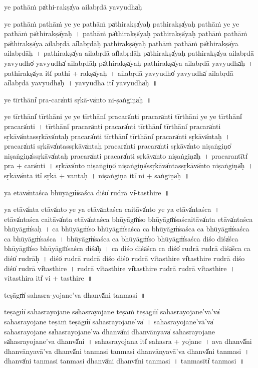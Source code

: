 \documentclass[parskip, DIV=14]{scrartcl}
\begin{document}
{ye pa॒thāṁ pa̍thi॒-rakṣa̍ya ailabṛ॒dā yavyudha̍ḥ

ye pa॒thāṁ pa॒thāṁ ye ye pa॒thāṁ pa̍thi॒rakṣa̍yaḥ pathi॒rakṣa̍yaḥ pa॒thāṁ ye ye pa॒thāṁ pa̍thi॒rakṣa̍yaḥ~।
pa॒thāṁ pa̍thi॒rakṣa̍yaḥ pathi॒rakṣa̍yaḥ pa॒thāṁ pa॒thāṁ pa̍thi॒rakṣa̍ya ailabṛ॒dā ai̍labṛ॒dāḥ pathi॒rakṣa̍yaḥ pa॒thāṁ pa॒thāṁ pa̍thi॒rakṣa̍ya ailabṛ॒dāḥ~।
pa॒thi॒rakṣa̍ya ailabṛ॒dā ai̍labṛ॒dāḥ pa̍thi॒rakṣa̍yaḥ pathi॒rakṣa̍ya ailabṛ॒dā ya॒vyudho̍ ya॒vyudha̍ ailabṛ॒dāḥ pa̍thi॒rakṣa̍yaḥ pathi॒rakṣa̍ya ailabṛ॒dā ya॒vyudha̍ḥ~।
pa॒thi॒rakṣa̍ya॒ iti̍ pathi + rakṣa̍yaḥ~।
ai॒la॒bṛ॒dā ya॒vyudho̍ ya॒vyudha̍ ailabṛ॒dā ai̍labṛ॒dā ya॒vyudha̍ḥ~।
ya॒vyudha॒ iti̍ ya॒vyudha̍ḥ~॥

ye tī॒rthāni̍ pra॒-cara̍nti sṛ॒kā-va̍nto ni-ṣa॒ṅgiṇa̍ḥ~॥

ye tī॒rthāni̍ tī॒rthāni॒ ye ye tī॒rthāni̍ pra॒cara̍nti pra॒cara̍nti tī॒rthāni॒ ye ye tī॒rthāni̍ pra॒cara̍nti~।
tī॒rthāni̍ pra॒cara̍nti pra॒cara̍nti tī॒rthāni̍ tī॒rthāni̍ pra॒cara̍nti sṛ॒kāva̍ntassṛ॒kāva̍ntaḥ pra॒cara̍nti tī॒rthāni̍ tī॒rthāni̍ pra॒cara̍nti sṛ॒kāva̍ntaḥ~।
pra॒cara̍nti sṛ॒kāva̍ntassṛ॒kāva̍ntaḥ pra॒cara̍nti pra॒cara̍nti sṛ॒kāva̍nto niṣa॒ṅgiṇo̍ niṣa॒ṅgiṇa̍ssṛ॒kāva̍ntaḥ pra॒cara̍nti pra॒cara̍nti sṛ॒kāva̍nto niṣa॒ṅgiṇa̍ḥ~।
pra॒cara॒ntīti̍ pra + cara̍nti~।
sṛ॒kāva̍nto niṣa॒ṅgiṇo̍ niṣa॒ṅgiṇa̍ssṛ॒kāva̍ntassṛ॒kāva̍nto niṣa॒ṅgiṇa̍ḥ~।
sṛ॒kāva̍nta॒ iti̍ sṛ॒kā + va॒nta॒ḥ॒~।
ni॒ṣa॒ṅgiṇa॒ iti̍ ni + sa॒ṅgiṇa̍ḥ~॥

ya e॒tāva̍ntaśca॒ bhūyāgṁ̍saśca॒ diśo̍ ru॒drā vi̍-tasthi॒re~॥

ya e॒tāva̍nta e॒tāva̍nto॒ ye ya e॒tāva̍ntaśca cai॒tāva̍nto॒ ye ya e॒tāva̍ntaśca~।
e॒tāva̍ntaśca cai॒tāva̍nta e॒tāva̍ntaśca॒ bhūyāgṁ̍so॒ bhūyāgṁ̍saścai॒tāva̍nta e॒tāva̍ntaśca॒ bhūyāgṁ̍saḥ~।
ca॒ bhūyāgṁ̍so॒ bhūyāgṁ̍saśca ca॒ bhūyāgṁ̍saśca ca॒ bhūyāgṁ̍saśca ca॒ bhūyāgṁ̍saśca~।
bhūyāgṁ̍saśca ca॒ bhūyāgṁ̍so॒ bhūyāgṁ̍saśca॒ diśo॒ diśa̍śca bhūyāgṁ̍so॒ bhūyāgṁ̍saśca॒ diśa̍ḥ~।
ca॒ diśo॒ diśa̍śca ca॒ diśo̍ ru॒drā ru॒drā diśa̍śca ca॒ diśo̍ ru॒drāḥ~।
diśo̍ ru॒drā ru॒drā diśo॒ diśo̍ ru॒drā vi̍tasthi॒re vi̍tasthi॒re ru॒drā diśo॒ diśo̍ ru॒drā vi̍tasthi॒re~।
ru॒drā vi̍tasthi॒re vi̍tasthi॒re ru॒drā ru॒drā vi̍tasthi॒re~।
vi॒ta॒sthi॒ra iti̍ vi + ta॒sthi॒re~॥

teṣāgṁ̍ sahasra-yoja॒ne'va॒ dhanvā̍ni tanmasi~॥

teṣāgṁ̍ sahasrayoja॒ne sa̍hasrayoja॒ne teṣā॒ṁ teṣāgṁ̍ sahasrayoja॒ne'vā'va̍ sahasrayoja॒ne teṣā॒ṁ teṣāgṁ̍ sahasrayoja॒ne'va̍~। %
sa॒ha॒sra॒yo॒ja॒ne'vā'va̍ sahasrayoja॒ne sa̍hasrayoja॒ne'va॒ dhanvā̍ni॒ dhanvā॒nyava̍ sahasrayoja॒ne sa̍hasrayoja॒ne'va॒ dhanvā̍ni~। %
sa॒ha॒sra॒yo॒ja॒na iti̍ sahasra + yo॒ja॒ne~।
ava॒ dhanvā̍ni॒ dhanvā॒nyavā'va॒ dhanvā̍ni tanmasi tanmasi॒ dhanvā॒nyavā'va॒ dhanvā̍ni tanmasi~। %
dhanvā̍ni tanmasi tanmasi॒ dhanvā̍ni॒ dhanvā̍ni tanmasi~।
ta॒nma॒sīti̍ tanmasi~॥

}
\end{document}
